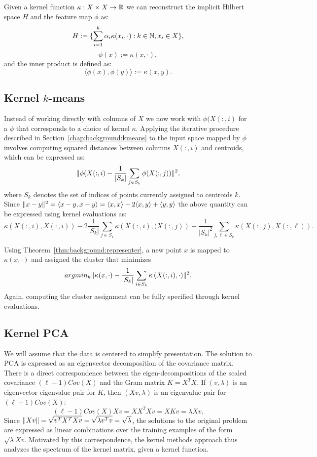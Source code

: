 \begin{theorem}\label{thm:background:representer}
Given a kernel function $\kappa: X \times X \rightarrow \mathbb{R}$ we can reconstruct the implicit Hilbert space $H$ and the feature map $\phi$ as:
$$ H := \{ \sum_{i=1}^k \alpha_i \kappa(x_i, \cdot): k \in \mathbb{N}, x_i \in X \},$$
$$ \phi(x) := \kappa(x, \cdot), $$ and the inner product is defined as:
$$ \langle \phi(x), \phi(y) \rangle := \kappa(x,y).$$
\end{theorem}

\subsection{Kernel $k$-means}

Instead of working directly with columns of $X$ we now work with $\phi(X(:,i)$ for a $\phi$ that corresponds to a choice of kernel $\kappa$.
Applying the iterative procedure described in Section~\ref{chap:background:kmeans} to the input space mapped by $\phi$ involves computing squared distances between columns $X(:,i)$ and centroids, which can be expressed as:
$$ \lVert \phi(X(:,i) - \frac{1}{|S_k|} \sum_{j \in S_k} \phi(X(:,j)) \rVert^2,$$
where $S_k$ denotes the set of indices of points currently assigned to centroids $k$.
Since $\lVert x - y\rVert^2 = \langle x-y, x-y \rangle = \langle x,x \rangle - 2 \langle x, y \rangle + \langle y, y \rangle$
the above quantity can be expressed using kernel evaluations as:
$$ \kappa\left(X(:,i),X(:,i)\right) - 2 \frac{1}{|S_k|} \sum_{j \in S_k} \kappa\left(X(:,i), (X(:,j) \right) + \frac{1}{|S_k|^2} \sum_{j,\ell \in S_k} \kappa\left( X(:,j), X(:,\ell) \right).$$

Using Theorem~\ref{thm:background:representer}, a new point $x$ is mapped to $\kappa(x, \cdot)$ and assigned the cluster that
minimizes
$$ argmin_k \lVert \kappa(x,\cdot) - \frac{1}{|S_k|} \sum_{i \in S_k} \kappa\left(X(:,i), \cdot\right)\rVert^2.$$
Again, computing the cluster assignment can be fully specified through kernel evaluations.

\subsection{Kernel PCA}

We will assume that the data is centered to simplify presentation.
The solution to PCA is expressed as an eigenvector decomposition of the covariance matrix. There is a direct correspondence between
the eigen-decompositions of the scaled covariance $(\ell - 1) Cov(X)$ and the Gram matrix $K = X^T X$.
If $(v, \lambda)$ is an eigenvector-eigenvalue pair for $K$, then $(X v, \lambda)$ is an eigenvalue pair for $(\ell - 1) Cov(X)$:
$$ (\ell - 1) Cov(X) X v = X X^T X v = X K v = \lambda X v.$$
Since $\lVert X v\rVert = \sqrt{v^T X^T X v} = \sqrt{ \lambda v^T v } = \sqrt{\lambda}$,
the solutions to the original problem are expressed as linear combinations over the training examples of the form $\sqrt{\lambda}X v$.
Motivated by this correspondence, the kernel methods approach thus analyzes the spectrum of the kernel matrix, given a kernel function.

